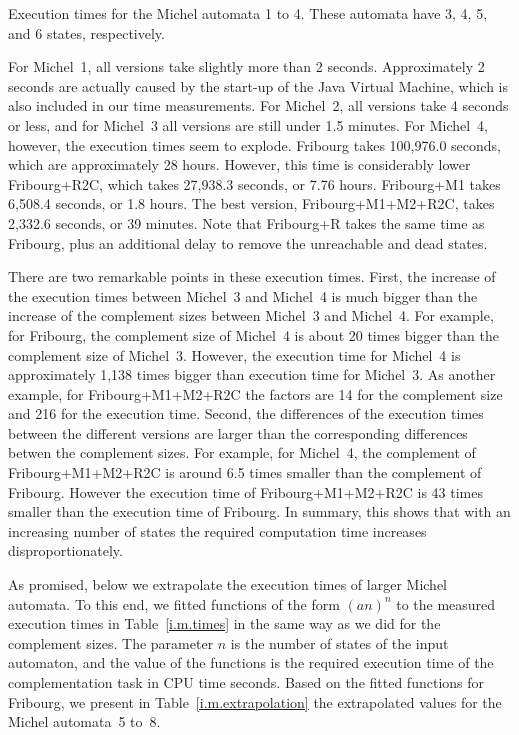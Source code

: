 \begin{table}[htb]
\centering

\caption{Execution times for the Michel automata 1 to 4. These automata have 3, 4, 5, and 6 states, respectively.}
\label{i.m.times}
\end{table}

For Michel~1, all versions take slightly more than 2 seconds. Approximately 2 seconds are actually caused by the start-up of the Java Virtual Machine, which is also included in our time measurements. For Michel~2, all versions take 4 seconds or less, and for Michel~3 all versions are still under 1.5 minutes. For Michel~4, however, the execution times seem to explode. Fribourg takes 100,976.0 seconds, which are approximately 28 hours. However, this time is considerably lower Fribourg+R2C, which takes 27,938.3 seconds, or 7.76 hours. Fribourg+M1 takes 6,508.4 seconds, or 1.8 hours. The best version, Fribourg+M1+M2+R2C, takes 2,332.6 seconds, or 39 minutes. Note that Fribourg+R takes the same time as Fribourg, plus an additional delay to remove the unreachable and dead states.

There are two remarkable points in these execution times. First, the increase of the execution times between Michel~3 and Michel~4 is much bigger than the increase of the complement sizes between Michel~3 and Michel~4. For example, for Fribourg, the complement size of Michel~4 is about 20 times bigger than the complement size of Michel~3. However, the execution time for Michel~4 is approximately 1,138 times bigger than execution time for Michel~3. As another example, for Fribourg+M1+M2+R2C the factors are 14 for the complement size and 216 for the execution time. Second, the differences of the execution times between the different versions are larger than the corresponding differences betwen the complement sizes. For example, for Michel~4, the complement of Fribourg+M1+M2+R2C is around 6.5 times smaller than the complement of Fribourg. However the execution time of Fribourg+M1+M2+R2C is 43 times smaller than the execution time of Fribourg. In summary, this shows that with an increasing number of states the required computation time increases disproportionately.

As promised, below we extrapolate the execution times of larger Michel automata. To this end, we fitted functions of the form $(an)^n$ to the measured execution times in Table~\ref{i.m.times} in the same way as we did for the complement sizes. The parameter $n$ is the number of states of the input automaton, and the value of the functions is the required execution time of the complementation task in CPU time seconds. Based on the fitted functions for Fribourg, we present in Table~\ref{i.m.extrapolation} the extrapolated values for the Michel automata~5 to~8.


